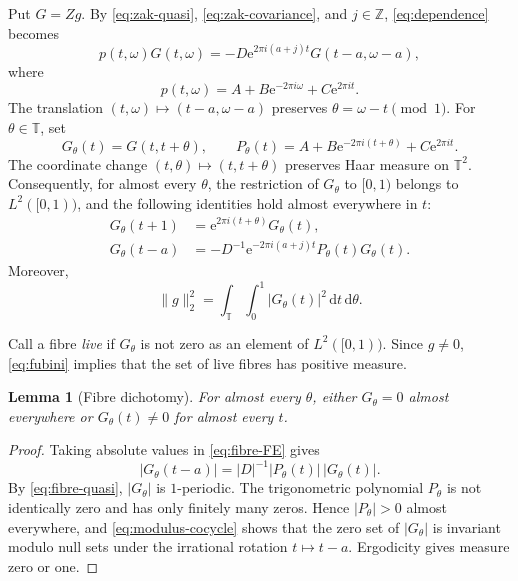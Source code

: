 \documentclass[11pt]{amsart}
\newtheorem{lemma}[theorem]{Lemma}
\theoremstyle{remark}
\newcommand{\Z}{\mathbb Z}
\newcommand{\T}{\mathbb T}
\newcommand{\e}{\mathrm e}
\newcommand{\dd}{\,\mathrm d}
\begin{document}
Put $G=Zg$. By \eqref{eq:zak-quasi}, \eqref{eq:zak-covariance}, and $j\in\Z$,
\eqref{eq:dependence} becomes
\begin{equation}\label{eq:FE}
 p(t,\omega)G(t,\omega)
 =-D\e^{2\pi i(a+j)t}G(t-a,\omega-a),
\end{equation}
where
\begin{equation}\label{eq:p}
 p(t,\omega)=A+B\e^{-2\pi i\omega}+C\e^{2\pi i t}.
\end{equation}
The translation $(t,\omega)\mapsto(t-a,\omega-a)$ preserves
$\theta=\omega-t\pmod1$. For $\theta\in\T$, set
\[
 G_\theta(t)=G(t,t+\theta),
 \qquad
 P_\theta(t)=A+B\e^{-2\pi i(t+\theta)}+C\e^{2\pi i t}.
\]
The coordinate change $(t,\theta)\mapsto(t,t+\theta)$ preserves Haar measure on
$\T^2$. Consequently, for almost every $\theta$, the restriction of $G_\theta$ to
$[0,1)$ belongs to $L^2([0,1))$, and the following identities hold almost everywhere
in $t$:
\begin{align}
 G_\theta(t+1)&=\e^{2\pi i(t+\theta)}G_\theta(t),\label{eq:fibre-quasi}\\
 G_\theta(t-a)&=-D^{-1}\e^{-2\pi i(a+j)t}P_\theta(t)G_\theta(t).
 \label{eq:fibre-FE}
\end{align}
Moreover,
\begin{equation}\label{eq:fubini}
 \|g\|_2^2=\int_\T\int_0^1 |G_\theta(t)|^2\dd t\dd\theta.
\end{equation}

Call a fibre \emph{live} if $G_\theta$ is not zero as an element of $L^2([0,1))$.
Since $g\ne0$, \eqref{eq:fubini} implies that the set of live fibres has positive
measure.

\begin{lemma}[Fibre dichotomy]\label{lem:dichotomy}
For almost every $\theta$, either $G_\theta=0$ almost everywhere or
$G_\theta(t)\ne0$ for almost every $t$.
\end{lemma}

\begin{proof}
Taking absolute values in \eqref{eq:fibre-FE} gives
\begin{equation}\label{eq:modulus-cocycle}
 |G_\theta(t-a)|=|D|^{-1}|P_\theta(t)|\,|G_\theta(t)|.
\end{equation}
By \eqref{eq:fibre-quasi}, $|G_\theta|$ is $1$-periodic. The trigonometric
polynomial $P_\theta$ is not identically zero and has only finitely many zeros.
Hence $|P_\theta|>0$ almost everywhere, and \eqref{eq:modulus-cocycle} shows that
the zero set of $|G_\theta|$ is invariant modulo null sets under the irrational
rotation $t\mapsto t-a$. Ergodicity gives measure zero or one.
\end{proof}
\end{document}
